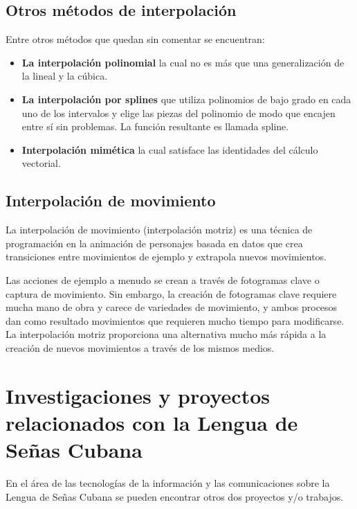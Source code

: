 \subsection{Otros métodos de interpolación}
Entre otros métodos que quedan sin comentar se encuentran:
\begin{itemize}

\item \textbf{La interpolación polinomial} la cual no es más que una generalización de la lineal y la cúbica.

\item \textbf{La interpolación por splines} que utiliza polinomios de bajo grado en cada uno de los intervalos y elige las piezas del polinomio de modo que encajen entre sí sin problemas. La función resultante es llamada spline.
 
\item \textbf{Interpolación mimética} la cual satisface las identidades del cálculo vectorial.

\end{itemize}

\subsection{Interpolación de movimiento}

La interpolación de movimiento (interpolación motriz) es una técnica de programación en la animación de personajes basada en datos que crea transiciones entre movimientos de ejemplo y extrapola nuevos movimientos.

Las acciones de ejemplo a menudo se crean a través de fotogramas clave o captura de movimiento. Sin embargo, la creación de fotogramas clave requiere mucha mano de obra y carece de variedades de movimiento, y ambos procesos dan como resultado movimientos que requieren mucho tiempo para modificarse. La interpolación motriz proporciona una alternativa mucho más rápida a la creación de nuevos movimientos a través de los mismos medios.


\section{Investigaciones y proyectos relacionados con la Lengua de Señas Cubana}\label{section:state-of-the-art:cubana}
En el área de las tecnologías de la información y las
comunicaciones sobre la Lengua de Señas Cubana  se pueden encontrar otros dos proyectos y/o trabajos.
 
